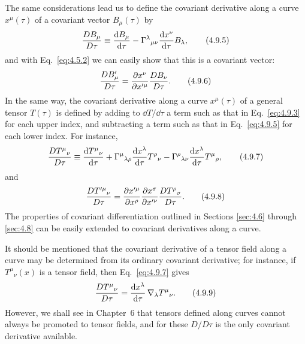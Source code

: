 The same considerations lead us to define the covariant derivative along a
curve \(x^\mu(\tau)\) of a covariant vector \(B_\mu(\tau)\) by
\begin{equation}
  \frac{D B_\mu}{D\tau}
  \equiv
  \frac{\mathop{}\!\mathrm{d} B_\mu}{\mathop{}\!\mathrm{d}\tau}
  -
  \Gamma^\lambda{}_{\mu\nu}
  \frac{\mathop{}\!\mathrm{d} x^\nu}{\mathop{}\!\mathrm{d}\tau}B_\lambda,
  \tag{4.9.5}\label{eq:4.9.5}
\end{equation}
and with Eq.~\eqref{eq:4.5.2} we can easily show that this is a covariant
vector:
\begin{equation}
  \frac{D B'_\mu}{D\tau}
  =
  \frac{\partial x^\nu}{\partial x'^\mu}
  \frac{D B_\nu}{D\tau}.
  \tag{4.9.6}\label{eq:4.9.6}
\end{equation}
In the same way, the covariant derivative along a curve \(x^\mu(\tau)\) of a
general tensor \(T(\tau)\) is defined by adding to \(\dd T/\dd\tau\) a term
such as that in Eq.~\eqref{eq:4.9.3} for each upper index, and subtracting a
term such as that in Eq.~\eqref{eq:4.9.5} for each lower index. For instance,
\begin{equation}
  \frac{D T^\mu{}_\nu}{D\tau}
  \equiv
  \frac{\mathop{}\!\mathrm{d} T^\mu{}_\nu}{\mathop{}\!\mathrm{d}\tau}
  +
  \Gamma^\mu{}_{\lambda\rho}
  \frac{\mathop{}\!\mathrm{d} x^\lambda}{\mathop{}\!\mathrm{d}\tau}T^\rho{}_\nu
  -
  \Gamma^\rho{}_{\lambda\nu}
  \frac{\mathop{}\!\mathrm{d} x^\lambda}{\mathop{}\!\mathrm{d}\tau}T^\mu{}_\rho,
  \tag{4.9.7}\label{eq:4.9.7}
\end{equation}
and
\begin{equation}
  \frac{D T'^\mu{}_\nu}{D\tau}
  =
  \frac{\partial x'^\mu}{\partial x^\rho}
  \frac{\partial x^\sigma}{\partial x'^\nu}
  \frac{D T^\rho{}_\sigma}{D\tau}.
  \tag{4.9.8}\label{eq:4.9.8}
\end{equation}
The properties of covariant differentiation outlined in Sections
\ref{sec:4.6} through \ref{sec:4.8} can be easily extended to covariant
derivatives along a curve.

It should be mentioned that the covariant derivative of a tensor field along
a curve may be determined from its ordinary covariant derivative; for
instance, if \(T^\mu{}_\nu(x)\) is a tensor field, then
Eq.~\eqref{eq:4.9.7} gives
\begin{equation}
  \frac{D T^\mu{}_\nu}{D\tau}
  =
  \frac{\mathop{}\!\mathrm{d} x^\lambda}{\mathop{}\!\mathrm{d}\tau}\,
  \nabla_\lambda T^\mu{}_\nu.
  \tag{4.9.9}\label{eq:4.9.9}
\end{equation}
However, we shall see in Chapter~6 that tensors defined along curves cannot
always be promoted to tensor fields, and for these \(D/D\tau\) is the only
covariant derivative available.

